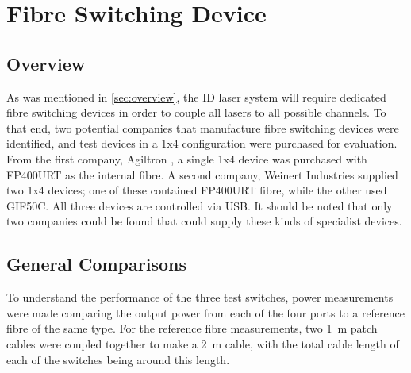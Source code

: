 \documentclass[a4paper,11pt]{article}
\begin{document}
\section{Fibre Switching Device}\label{sec:switch}

\subsection{Overview}
As was mentioned in \cref{sec:overview}, the ID laser system will require dedicated fibre switching devices in order to couple all lasers to all possible channels. To that end, two potential companies that manufacture fibre switching devices were identified, and test devices in a 1x4 configuration were purchased for evaluation. From the first company, Agiltron \cite{bib:agiltron}, a single 1x4 device was purchased with FP400URT as the internal fibre. A second company, Weinert Industries \cite{bib:weinert} supplied two 1x4 devices; one of these contained FP400URT fibre, while the other used GIF50C. All three devices are controlled via USB. It should be noted that only two companies could be found that could supply these kinds of specialist devices.

\subsection{General Comparisons}

To understand the performance of the three test switches, power measurements were made comparing the output power from each of the four ports to a reference fibre of the same type. For the reference fibre measurements, two 1~m patch cables were coupled together to make a 2~m cable, with the total cable length of each of the switches being around this length.
\end{document}
